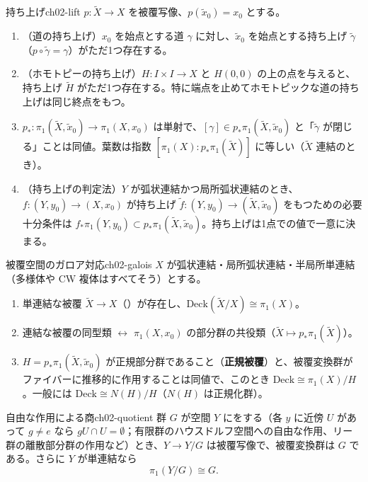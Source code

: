 \begin{mythm}{持ち上げ}{ch02-lift}
$p\colon\tilde X\to X$ を被覆写像、$p(\tilde x_0)=x_0$ とする。
\begin{enumerate}
\item （道の持ち上げ）$x_0$ を始点とする道 $\gamma$ に対し、$\tilde x_0$ を始点とする持ち上げ $\tilde\gamma$（$p\circ\tilde\gamma=\gamma$）がただ1つ存在する。
\item （ホモトピーの持ち上げ）$H\colon I\times I\to X$ と $H(0,0)$ の上の点を与えると、持ち上げ $\tilde H$ がただ1つ存在する。特に端点を止めてホモトピックな道の持ち上げは同じ終点をもつ。
\item $p_*\colon\pi_1(\tilde X,\tilde x_0)\to\pi_1(X,x_0)$ は単射で、$[\gamma]\in p_*\pi_1(\tilde X,\tilde x_0)$ と「$\tilde\gamma$ が閉じる」ことは同値。葉数は指数 $[\pi_1(X):p_*\pi_1(\tilde X)]$ に等しい（$\tilde X$ 連結のとき）。
\item （持ち上げの判定法）$Y$ が弧状連結かつ局所弧状連結のとき、$f\colon(Y,y_0)\to(X,x_0)$ が持ち上げ $\tilde f\colon(Y,y_0)\to(\tilde X,\tilde x_0)$ をもつための必要十分条件は $f_*\pi_1(Y,y_0)\subset p_*\pi_1(\tilde X,\tilde x_0)$。持ち上げは1点での値で一意に決まる。
\end{enumerate}
\end{mythm}

\begin{mythm}{被覆空間のガロア対応}{ch02-galois}
$X$ が弧状連結・局所弧状連結・半局所単連結（多様体や CW 複体はすべてそう）とする。
\begin{enumerate}
\item 単連結な被覆 $\tilde X\to X$（）が存在し、$\mathrm{Deck}(\tilde X/X)\cong\pi_1(X)$。
\item 連結な被覆の同型類 $\longleftrightarrow$ $\pi_1(X,x_0)$ の部分群の共役類（$\tilde X\mapsto p_*\pi_1(\tilde X)$）。
\item $H=p_*\pi_1(\tilde X,\tilde x_0)$ が正規部分群であること（\textbf{正規被覆}）と、被覆変換群がファイバーに推移的に作用することは同値で、このとき $\mathrm{Deck}\cong\pi_1(X)/H$。一般には $\mathrm{Deck}\cong N(H)/H$（$N(H)$ は正規化群）。
\end{enumerate}
\end{mythm}

\begin{mythm}{自由な作用による商}{ch02-quotient}
群 $G$ が空間 $Y$ にをする（各 $y$ に近傍 $U$ があって $g\ne e$ なら $gU\cap U=\emptyset$；有限群のハウスドルフ空間への自由な作用、リー群の離散部分群の作用など）とき、$Y\to Y/G$ は被覆写像で、被覆変換群は $G$ である。さらに $Y$ が単連結なら
\[
\pi_1(Y/G)\cong G .
\]
\end{mythm}

